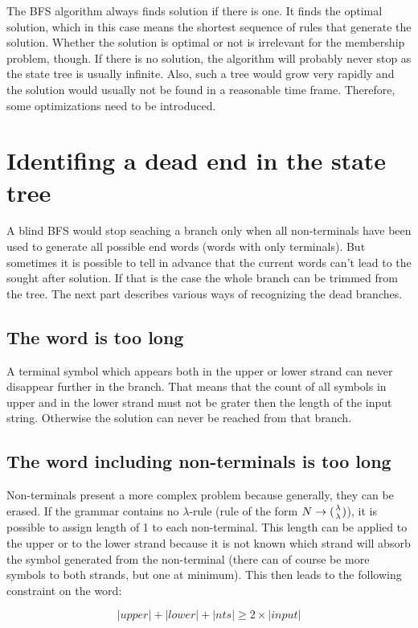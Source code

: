 The BFS algorithm always finds solution if there is one. It finds the optimal solution, which in this case means the shortest sequence of rules that generate the solution. Whether the solution is optimal or not is irrelevant for the membership problem, though. If there is no solution, the algorithm will probably never stop as the state tree is usually infinite. Also, such a tree would grow very rapidly and the solution would usually not be found in a reasonable time frame. Therefore, some optimizations need to be introduced.

\section{Identifing a dead end in the state tree}
A blind BFS would stop seaching a branch only when all non-terminals have been used to generate all possible end words (words with only terminals). But sometimes it is possible to tell in advance that the current words can't lead to the sought after solution. If that is the case the whole branch can be trimmed from the tree. The next part describes various ways of recognizing the dead branches.

\subsection{The word is too long}
A terminal symbol which appears both in the upper or lower strand can never disappear further in the branch. That means that the count of all symbols in upper and in the lower strand must not be grater then the length of the input string. Otherwise the solution can never be reached from that branch.

\subsection{The word including non-terminals is too long}
Non-terminals present a more complex problem because generally, they can be erased. If the grammar contains no $\lambda$-rule (rule of the form $N \rightarrow ({\lambda \atop \lambda})$), it is possible to assign length of 1 to each non-terminal. This length can be applied to the upper or to the lower strand because it is not known which strand will absorb the symbol generated from the non-terminal (there can of course be more symbols to both strands, but one at minimum). This then leads to the following constraint on the word:

$$|upper| + |lower| + |nts| \geq 2 \times |input|$$

